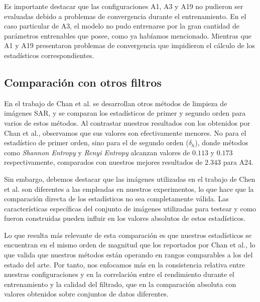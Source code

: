Es importante destacar que las configuraciones A1, A3 y A19 no pudieron ser evaluadas debido a problemas de convergencia durante el entrenamiento. En el caso particular de A3, el modelo no pudo entrenarse por la gran cantidad de parámetros entrenables que posee, como ya habíamos mencionado. Mientras que A1 y A19 presentaron problemas de convergencia que impidieron el cálculo de los estadísticos correspondientes.

\subsection{Comparación con otros filtros}


\vspace{0.2cm}

En el trabajo de Chan et al. \cite{chan2022entropy} se desarrollan otros métodos de limpieza de imágenes SAR, y se comparan los estadísticos de primer y segundo orden para varios de estos métodos. Al contrastar nuestros resultados con los obtenidos por Chan et al., observamos que sus valores son efectivamente menores. No para el estadístico de primer orden, sino para el de segundo orden ($\delta_h$​), donde métodos como \emph{Shannon Entropy} y \emph{Renyi Entropy} alcanzan valores de $0.113$ y $0.173$ respectivamente, comparados con nuestros mejores resultados de $2.343$ para A24.

Sin embargo, debemos destacar que las imágenes utilizadas en el trabajo de Chen et al. son diferentes a las empleadas en nuestros experimentos, lo que hace que la comparación directa de los estadísticos no sea completamente válida. Las características específicas del conjunto de imágenes utilizadas para testear y como fueron construidas pueden influir en los valores absolutos de estos estadísticos.

Lo que resulta más relevante de esta comparación es que nuestros estadísticos se encuentran en el mismo orden de magnitud que los reportados por Chan et al., lo que valida que nuestros métodos están operando en rangos comparables a los del estado del arte. Por tanto, nos enfocamos más en la consistencia relativa entre nuestras configuraciones y en la correlación entre el rendimiento durante el entrenamiento y la calidad del filtrado, que en la comparación absoluta con valores obtenidos sobre conjuntos de datos diferentes.

\vspace{0.3cm}

